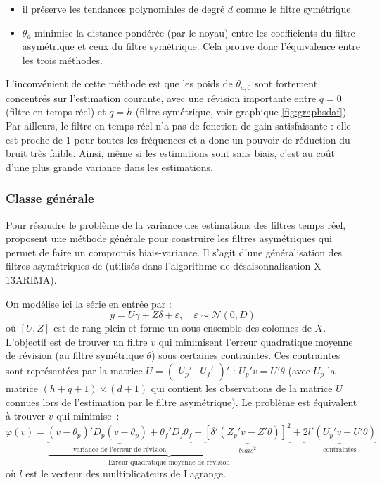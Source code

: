 \documentclass[
  11pt,
  french,
  a4paper]{article}
\newcommand\1{\mathds{1}}
\begin{document}
\begin{itemize}
\item
  il préserve les tendances polynomiales de degré \(d\) comme le filtre symétrique.
\item
  \(\theta_{a}\) minimise la distance pondérée (par le noyau) entre les coefficients du filtre asymétrique et ceux du filtre symétrique.
  Cela prouve donc l'équivalence entre les trois méthodes.
\end{itemize}

L'inconvénient de cette méthode est que les poids de \(\theta_{a,0}\) sont fortement concentrés sur l'estimation courante, avec une révision importante entre \(q=0\) (filtre en temps réel) et \(q=h\) (filtre symétrique, voir graphique \ref{fig:graphsdaf}).
Par ailleurs, le filtre en temps réel n'a pas de fonction de gain satisfaisante : elle est proche de 1 pour toutes les fréquences et a donc un pouvoir de réduction du bruit très faible.
Ainsi, même si les estimations sont sans biais, c'est au coût d'une plus grande variance dans les estimations.

\hypertarget{subsec-lppasymf}{%
\subsubsection{Classe générale}\label{subsec-lppasymf}}

Pour résoudre le problème de la variance des estimations des filtres temps réel, \textcite{proietti2008} proposent une méthode générale pour construire les filtres asymétriques qui permet de faire un compromis biais-variance.
Il s'agit d'une généralisation des filtres asymétriques de \textcite{musgrave1964set} (utilisés dans l'algorithme de désaisonnalisation X-13ARIMA).

On modélise ici la série en entrée par :
\begin{equation}
y=U\gamma+Z\delta+\varepsilon,\quad
\varepsilon\sim\mathcal{N}(0,D)
\label{eq:lpgeneralmodel}
\end{equation}
où \([U,Z]\) est de rang plein et forme un sous-ensemble des colonnes de \(X\).
L'objectif est de trouver un filtre \(v\) qui minimisent l'erreur quadratique moyenne de révision (au filtre symétrique \(\theta\)) sous certaines contraintes.
Ces contraintes sont représentées par la matrice \(U=\begin{pmatrix}U_{p}'&U_{f}'\end{pmatrix}'\) : \(U_p'v=U'\theta\) (avec \(U_p\) la matrice \((h+q+1)\times (d+1)\) qui contient les observations de la matrice \(U\) connues lors de l'estimation par le filtre asymétrique).
Le problème est équivalent à trouver \(v\) qui minimise~:
\begin{equation}
\varphi(v)=
\underbrace{
  \underbrace{(v-\theta_{p})'D_{p}(v-\theta_{p})+
  \theta_{f}'D_{f}\theta_{f}}_\text{variance de l'erreur de révision}+
  \underbrace{[\delta'(Z_{p}'v-Z'\theta)]^{2}}_{biais^2}
}_\text{Erreur quadratique moyenne de révision}+
\underbrace{2l'(U_{p}'v-U'\theta)}_{\text{contraintes}}
\label{eq:lppasym}
\end{equation}
où \(l\) est le vecteur des multiplicateurs de Lagrange.
\end{document}
